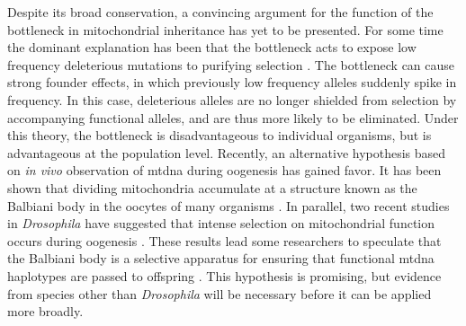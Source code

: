\documentclass[12pt,twoside]{reedthesis}
\begin{document}
Despite its broad conservation, a convincing argument for the function of the bottleneck in mitochondrial inheritance has yet to be presented.
For some time the dominant explanation has been that the bottleneck acts to expose low frequency deleterious mutations to purifying selection \citep{bergstrom_germline_1998}. 
The bottleneck can cause strong founder effects, in which previously low frequency alleles suddenly spike in frequency.
In this case, deleterious alleles are no longer shielded from selection by accompanying functional alleles, and are thus more likely to be eliminated. 
Under this theory, the bottleneck is disadvantageous to individual organisms, but is advantageous at the population level.
Recently, an alternative hypothesis based on \textit{in vivo} observation of \gls{mtdna} during oogenesis has gained favor. 
It has been shown that dividing mitochondria accumulate at a structure known as the Balbiani body in the oocytes of many organisms \citep{kloc_elaboration_1996, kloc_balbiani_2004}.
In parallel, two recent studies in \textit{Drosophila} have suggested that intense selection on mitochondrial function occurs during oogenesis \citep{ma_transmission_2014, hill_selective_2014}.
These results lead some researchers to speculate that the Balbiani body is a selective apparatus for ensuring that functional \gls{mtdna} haplotypes are passed to offspring \citep{cox_balbiani_2003, zhou_is_2010, stewart_keeping_2014}. 
This hypothesis is promising, but evidence from species other than \textit{Drosophila} will be necessary before it can be applied more broadly.

\end{document}
